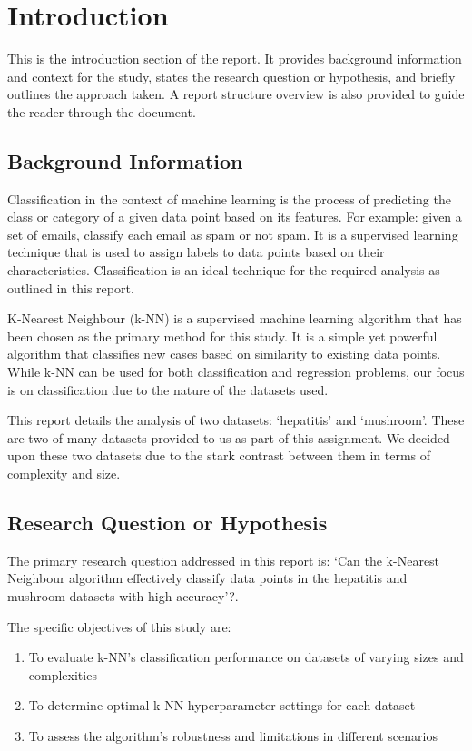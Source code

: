 \section{Introduction}
\label{sec:introduction}

This is the introduction section of the report. It provides background information and context for the study, states the research question or hypothesis, and briefly outlines the approach taken.
A report structure overview is also provided to guide the reader through the document.

\subsection{Background Information}

Classification in the context of machine learning is the process of predicting the class or category of a given data point based on its features.
For example: given a set of emails, classify each email as spam or not spam. 
It is a supervised learning technique that is used to assign labels to data points based on their characteristics.
Classification is an ideal technique for the required analysis as outlined in this report.\par

K-Nearest Neighbour (k-NN) is a supervised machine learning algorithm that has been chosen as the primary method for this study.
It is a simple yet powerful algorithm that classifies new cases based on similarity to existing data points.
While k-NN can be used for both classification and regression problems, our focus is on classification due to the nature of the datasets used.\par

This report details the analysis of two datasets: `hepatitis' and `mushroom'. These are two of many datasets provided to us as part of this assignment.
We decided upon these two datasets due to the stark contrast between them in terms of complexity and size.

\subsection{Research Question or Hypothesis}
The primary research question addressed in this report is: `Can the k-Nearest Neighbour algorithm effectively classify
data points in the hepatitis and mushroom datasets with high accuracy'?.\par

The specific objectives of this study are:
\begin{enumerate}
    \item To evaluate k-NN's classification performance on datasets of varying sizes and complexities
    \item To determine optimal k-NN hyperparameter settings for each dataset
    \item To assess the algorithm's robustness and limitations in different scenarios
\end{enumerate}

